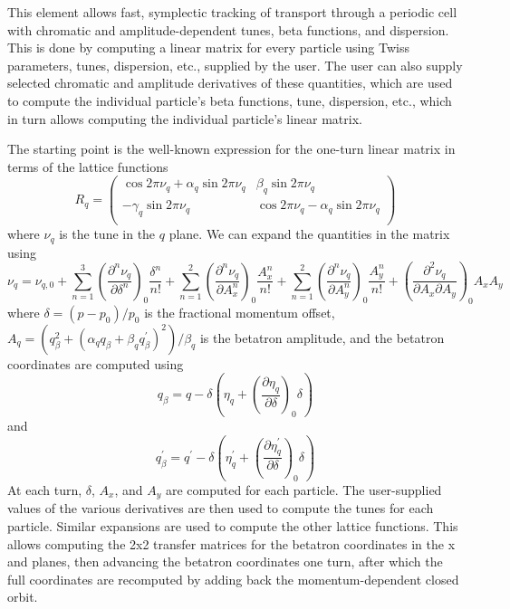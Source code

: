This element allows fast, symplectic tracking of transport through a
periodic cell with chromatic and amplitude-dependent tunes, beta
functions, and dispersion.  This is done by computing a linear matrix
for every particle using Twiss
parameters, tunes, dispersion, etc., supplied by the user.  The user
can also supply selected chromatic and amplitude derivatives of these
quantities, which are used to compute the individual particle's beta
functions, tune, dispersion, etc., which in turn allows computing the
individual particle's linear matrix.

The starting point is the well-known expression for the one-turn linear matrix
in terms of the lattice functions
\begin{equation}
R_q = 
\left(\begin{array}{cccc}
\cos 2\pi\nu_q + \alpha_q \sin 2\pi\nu_q & \beta_q \sin 2\pi\nu_q \\
-\gamma_q \sin 2\pi\nu_q                 & \cos 2\pi\nu_q - \alpha_q \sin 2\pi\nu_q     \\
\end{array}\right)
\end{equation}
where $\nu_q$ is the tune in the $q$ plane. We can expand the quantities in the matrix using
\begin{equation}
\nu_q = \nu_{q,0} + \sum_{n=1}^3 \left(\frac{\partial^n \nu_q}{\partial\delta^n}\right)_0\frac{\delta^n}{n!} + 
\sum_{n=1}^2 \left(\frac{\partial^n\nu_q}{\partial A_x^n}\right)_0 \frac{A_x^n}{n!} +
\sum_{n=1}^2 \left(\frac{\partial^n\nu_q}{\partial A_y^n}\right)_0 \frac{A_y^n}{n!} +
\left(\frac{\partial^2 \nu_q}{\partial A_x\partial A_y}\right)_0 A_x A_y
\end{equation}
where $\delta = (p-p_0)/p_0$ is the fractional momentum offset,
$A_q = (q_\beta^2 + (\alpha_q q_\beta + \beta_q q^\prime_\beta)^2)/\beta_q$ is
the betatron amplitude, and the betatron coordinates are computed using
\begin{equation}
q_\beta = q - \delta\left(\eta_q + \left(\frac{\partial \eta_q}{\partial \delta}\right)_0 \delta\right)
\end{equation}
and
\begin{equation}
q^\prime_\beta = q^\prime - \delta \left(\eta^\prime_q + \left(\frac{\partial \eta^\prime_q}{\partial \delta}\right)_0 \delta \right)
\end{equation}
At each turn, $\delta$, $A_x$, and $A_y$ are computed for each particle.
The user-supplied values of the various derivatives are then used to 
compute the tunes for each particle.
Similar expansions are used to compute the other lattice functions.
This allows computing the 2x2 transfer matrices for the betatron coordinates in the 
x and planes, then advancing the
betatron coordinates one turn, after which the full coordinates are recomputed by adding back the
momentum-dependent closed orbit.

